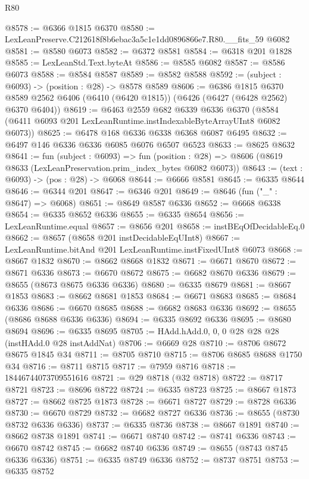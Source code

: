 \begin{lexlean}{R80}
\begin{coremodule}
@8578 := @6366 @1815 @6370
@8580 := LexLeanPreserve.C212618f8b6ebac3a5c1e1dd0896866e7.R80.__fits_59 @6082
@8581 := @8580 @6073
@8582 := @6372 @8581
@8584 := @6318 @201 @1828
@8585 := LexLeanStd.Text.byteAt
@8586 := @8585 @6082
@8587 := @8586 @6073
@8588 := @8584 @8587
@8589 := @8582 @8588
@8592 := (subject : @6093) -> (position : @28) -> @8578 @8589
@8606 := @6386
    @1815
    @6370
    @8589
    @2562
    @6406
    (@6410 (@6420 @1815))
    (@6426 (@6427 (@6428 @2562) @6370 @6404))
@8619 := @6463
    @2559
    @682
    @6339
    @6336
    @6370
    (@8584 (@6411 @6093 @201 LexLeanRuntime.instIndexableByteArrayUInt8 @6082 @6073))
@8625 := @6478 @168 @6336 @6338 @6368 @6087 @6495
@8632 := @6497 @146 @6336 @6336 @6085 @6076 @6507 @6523
@8633 := @8625 @8632
@8641 := fun (subject : @6093) =>
  fun (position : @28) => @8606 (@8619 @8633 (LexLeanPreservation.prim_index_bytes @6082 @6073))
@8643 := (text : @6093) -> (pos : @28) -> @6068
@8644 := @6666 @8581
@8645 := @6335 @8644
@8646 := @6344 @201
@8647 := @6346 @201
@8649 := @8646 (fun ("_" : @8647) => @6068)
@8651 := @8649 @8587 @6336
@8652 := @6668 @6338
@8654 := @6335 @8652 @6336
@8655 := @6335 @8654
@8656 := LexLeanRuntime.equal
@8657 := @8656 @201
@8658 := instBEqOfDecidableEq.{0}
@8662 := @8657 (@8658 @201 instDecidableEqUInt8)
@8667 := LexLeanRuntime.bitAnd @201 LexLeanRuntime.instFixedUInt8 @6073
@8668 := @8667 @1832
@8670 := @8662 @8668 @1832
@8671 := @6671 @8670
@8672 := @8671 @6336
@8673 := @6670 @8672
@8675 := @6682 @8670 @6336
@8679 := @8655 (@8673 @8675 @6336 @6336)
@8680 := @6335 @8679
@8681 := @8667 @1853
@8683 := @8662 @8681 @1853
@8684 := @6671 @8683
@8685 := @8684 @6336
@8686 := @6670 @8685
@8688 := @6682 @8683 @6336
@8692 := @8655 (@8686 @8688 @6336 @6336)
@8694 := @6335 @8692 @6336
@8695 := @8680 @8694
@8696 := @6335 @8695
@8705 := HAdd.hAdd.{0, 0, 0} @28 @28 @28 (instHAdd.{0} @28 instAddNat)
@8706 := @6669 @28
@8710 := @8706 @8672 @8675 @1845 @34
@8711 := @8705 @8710
@8715 := @8706 @8685 @8688 @1750 @34
@8716 := @8711 @8715
@8717 := @7959 @8716
@8718 := 18446744073709551616
@8721 := @29 @8718 (@32 @8718)
@8722 := @8717 @8721
@8723 := @8696 @8722
@8724 := @6335 @8723
@8725 := @8667 @1873
@8727 := @8662 @8725 @1873
@8728 := @6671 @8727
@8729 := @8728 @6336
@8730 := @6670 @8729
@8732 := @6682 @8727 @6336
@8736 := @8655 (@8730 @8732 @6336 @6336)
@8737 := @6335 @8736
@8738 := @8667 @1891
@8740 := @8662 @8738 @1891
@8741 := @6671 @8740
@8742 := @8741 @6336
@8743 := @6670 @8742
@8745 := @6682 @8740 @6336
@8749 := @8655 (@8743 @8745 @6336 @6336)
@8751 := @6335 @8749 @6336
@8752 := @8737 @8751
@8753 := @6335 @8752

\end{coremodule}
\end{lexlean}
